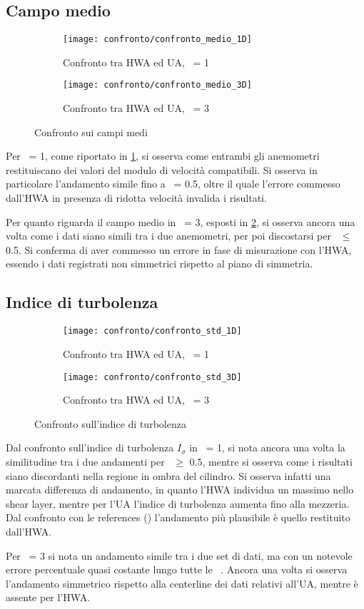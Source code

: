 \documentclass{article} %
\newcommand{\xd}{\nicefrac{\textrm{x}}{\textrm{D}}\ }
\newcommand{\yd}{\nicefrac{\textrm{y}}{\textrm{D}}\ }
\begin{document}
\subsection{Campo medio}
\begin{figure}[h!]
	\centering
	\begin{subfigure}{0.4\textwidth}
		\texttt{[image: confronto/confronto\_medio\_1D]}
		\caption{Confronto tra HWA ed UA, \xd = 1}
		\label{fig:confronto_medio_1D}
	\end{subfigure}\qquad
	\begin{subfigure}{0.4\textwidth}
		\texttt{[image: confronto/confronto\_medio\_3D]}
		\caption{Confronto tra HWA ed UA, \xd = 3}
		\label{fig:confronto_medio_3D}		
	\end{subfigure}
	\caption{Confronto sui campi medi}
	\label{fig:confronto_medio}
\end{figure}
Per \xd = 1, come riportato in \cref{fig:confronto_medio_1D}, si osserva come entrambi gli anemometri restituiscano dei valori del modulo di velocità compatibili. Si osserva in particolare l'andamento simile fino a \yd = 0.5, oltre il quale l'errore commesso dall'HWA in presenza di ridotta velocità invalida i risultati.\par
Per quanto riguarda il campo medio in \xd = 3, esposti in \cref{fig:confronto_medio_3D}, si osserva ancora una volta come i dati siano simili tra i due anemometri, per poi discostarsi per \yd $\le$ 0.5. Si conferma di aver commesso un errore in fase di misurazione con l'HWA, essendo i dati registrati non simmetrici rispetto al piano di simmetria.
\subsection{Indice di turbolenza}
\begin{figure}[h!]
	\centering
	\begin{subfigure}{0.4\textwidth}
		\texttt{[image: confronto/confronto\_std\_1D]}
		\caption{Confronto tra HWA ed UA, \xd = 1}
	\end{subfigure}\qquad
	\begin{subfigure}{0.4\textwidth}
		\texttt{[image: confronto/confronto\_std\_3D]}
		\caption{Confronto tra HWA ed UA, \xd = 3}
	\end{subfigure}
	\caption{Confronto sull'indice di turbolenza}
	\label{fig:confronto_sigma}
\end{figure}
Dal confronto sull'indice di turbolenza $I_\sigma$ in \xd = 1, si nota ancora una volta la similitudine tra i due andamenti per \yd $\ge$ 0.5, mentre si osserva come i risultati siano discordanti nella regione in ombra del cilindro. Si osserva infatti una marcata differenza di andamento, in quanto l'HWA individua un massimo nello shear layer, mentre per l'UA l'indice di turbolenza aumenta fino alla mezzeria. Dal confronto con le references (\cite{elmakdah13}) l'andamento più plausibile è quello restituito dall'HWA.\par
Per \xd = 3 si nota un andamento simile tra i due set di dati, ma con un notevole errore percentuale quasi costante lungo tutte le \yd. Ancora una volta si osserva l'andamento simmetrico rispetto alla centerline dei dati relativi all'UA, mentre è assente per l'HWA.
\clearpage
\end{document}
